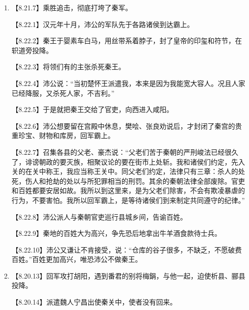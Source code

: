 \documentclass[fontset=none,11pt,a4paper]{ctexart}
\begin{document}
\begin{enumerate}[label=\Alph*.]
\noindent 【8.10.10】这时刘季再三谦让，大家都不敢担任，最后还是立刘季为沛公。\par
\noindent 【8.10.11】在沛县衙门的庭院里祭祀黄帝和蚩尤，又用牲血衅鼓旗。\par
\noindent 【8.10.12】旗子一律红色，因为刘季所杀蛇是白帝的儿子，杀蛇的是赤帝的儿子，所以崇尚赤色。\par
\noindent 【8.10.13】于是少年子弟和有势的官吏，如萧何、曹参、樊哙等人，都为沛公征集兵员，集合了两三千人，攻打胡陵、方与，回军固守丰邑。\par
\noindent 【8.11.1】秦二世二年，陈胜将领周章的军队西至戏水而还。\par
  \item
\noindent 【8.21.7】乘胜追击，彻底打垮了秦军。\par
\noindent 【8.22.1】汉元年十月，沛公的军队先于各路诸侯到达霸上。\par
\noindent 【8.22.2】秦王于婴素车白马，用丝带系着脖子，封了皇帝的印玺和符节，在轵道旁投降。\par
\noindent 【8.22.3】将领们有的主张杀死秦王。\par
\noindent 【8.22.4】沛公说：“当初楚怀王派遣我，本来是因为我能宽大容人。况且人家已经降服，又杀死人家，不吉利。”\par
\noindent 【8.22.5】于是就把秦王交给了官吏，向西进入咸阳。\par
\noindent 【8.22.6】沛公想要留在宫殿中休息，樊哙、张良劝说后，才封闭了秦宫的贵重珍宝、财物和库房，回军霸上。\par
\noindent 【8.22.7】召集各县的父老、豪杰说：“父老们苦于秦朝的严刑峻法已经很久了，诽谤朝政的要灭族，相聚议论的要在街市上处斩。我和诸侯们约定，先入关的在关中称王，我应当称王关中。同父老们约定，法律只有三章：杀人的处死，伤人和抢劫的处以与所犯罪相当的刑罚。其余的秦朝法律全部废除。官吏和百姓都要安居如故。我所以到这里来，是为父老们除害，不会有欺凌暴虐的行为，不要害怕。我所以回军霸上，是等待诸侯们到来制定共同遵守的纪律。”\par
\noindent 【8.22.8】沛公派人与秦朝官吏巡行县城乡间，告谕百姓。\par
\noindent 【8.22.9】秦地的百姓大为高兴，争先恐后地拿出牛羊酒食款待士兵。\par
\noindent 【8.22.10】沛公又谦让不肯接受，说：“仓库的谷子很多，不缺乏，不愿破费百姓。”百姓更加高兴，唯恐沛公不做秦王。\par
  \item
\noindent 【8.20.13】回军攻打胡阳，遇到番君的别将梅鋗，与他一起，迫使析县、郦县投降。\par
\noindent 【8.20.14】派遣魏人宁昌出使秦关中，使者没有回来。\par

\end{enumerate}
\end{document}
